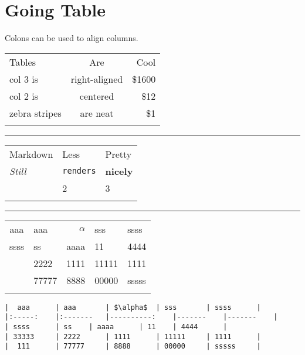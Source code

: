 \section{Going Table}\label{going-table}

Colons can be used to align columns.

\begin{longtable}[c]{@{}lcr@{}}
\toprule\addlinespace
Tables & Are & Cool
\\\addlinespace
\midrule\endhead
col 3 is & right-aligned & \$1600
\\\addlinespace
col 2 is & centered & \$12
\\\addlinespace
zebra stripes & are neat & \$1
\\\addlinespace
\bottomrule
\end{longtable}

\begin{center}\rule{3in}{0.4pt}\end{center}

\begin{longtable}[c]{@{}lll@{}}
\toprule\addlinespace
Markdown & Less & Pretty
\\\addlinespace
\midrule\endhead
\emph{Still} & \texttt{renders} & \textbf{nicely}
\\\addlinespace
1 & 2 & 3
\\\addlinespace
\bottomrule
\end{longtable}

\begin{center}\rule{3in}{0.4pt}\end{center}

\begin{longtable}[c]{@{}clrll@{}}
\toprule\addlinespace
aaa & aaa & $\alpha$ & sss & ssss
\\\addlinespace
\midrule\endhead
ssss & ss & aaaa & 11 & 4444
\\\addlinespace
33333 & 2222 & 1111 & 11111 & 1111
\\\addlinespace
111 & 77777 & 8888 & 00000 & sssss
\\\addlinespace
\bottomrule
\end{longtable}

\begin{verbatim}
|  aaa      | aaa       | $\alpha$  | sss       | ssss      |
|:-----:    |:-------   |----------:    |-------    |-------    |
| ssss      | ss    | aaaa      | 11    | 4444      |
| 33333     | 2222      | 1111      | 11111     | 1111      |
|  111      | 77777     | 8888      | 00000     | sssss     |
\end{verbatim}
